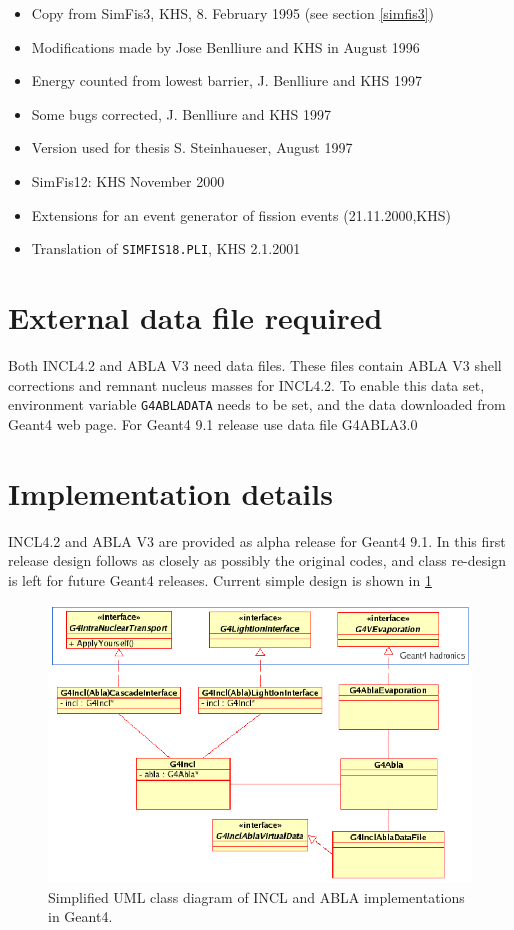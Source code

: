\begin{itemize}
\item Copy from {\sf SimFis3}, KHS, 8. February 1995 (see section \ref{simfis3})
\item Modifications made by Jose Benlliure and KHS in August 1996
\item Energy counted from lowest barrier, J. Benlliure and KHS 1997
\item Some bugs corrected, J. Benlliure and KHS 1997         
\item Version used for thesis S. Steinhaueser, August 1997
\item {\sf SimFis12}: KHS November 2000
\item Extensions for an event generator of fission events (21.11.2000,KHS)
\item Translation of {\tt SIMFIS18.PLI}, KHS 2.1.2001
\end{itemize}

\section{External data file required}

Both INCL4.2 and ABLA V3 need data files. These files contain ABLA V3 shell corrections and remnant nucleus masses for INCL4.2. 
To enable this data set, environment variable {\tt G4ABLADATA} needs to be set, 
and the data downloaded from Geant4 web page. For Geant4 9.1 release use data file G4ABLA3.0

\section{Implementation details}
INCL4.2 and ABLA V3 are provided as alpha release for Geant4 9.1.
In this first release design follows as closely as possibly the original codes,
and class re-design is left for future Geant4 releases.
Current simple design is shown in  \ref{fig:uml}

\begin{figure}
\begin{center}
\includegraphics[angle=0,scale=1.0]{InclAblaUml.eps}
\end{center}
\caption[INCL4 and ABLA class diagram]{Simplified UML class diagram of
  INCL and ABLA implementations in Geant4.}
\label{fig:uml}
\end{figure}


